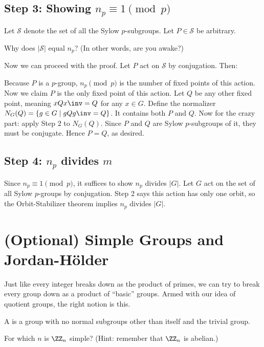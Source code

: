\subsection*{Step 3: Showing $n_p \equiv 1 \pmod p$}
Let $\mathcal S$ denote the set of all the Sylow $p$-subgroups.
Let $P \in \mathcal S$ be arbitrary.
\begin{ques}
	Why does $\left\lvert \mathcal S \right\rvert$ equal $n_p$?
	(In other words, are you awake?)
\end{ques}
Now we can proceed with the proof.
Let $P$ act on $\mathcal S$ by conjugation.
Then:
\begin{itemize}
	\ii Because $P$ is a $p$-group, $n_p \pmod p$ is the number of fixed points
	of this action.
	Now we claim $P$ is the only fixed point of this action.
	\ii Let $Q$ be any other fixed point, meaning $xQx\inv = Q$ for any $x \in G$.
	\ii Define the normalizer $N_G(Q) = \left\{ g \in G \mid gQg\inv = Q \right\}$.  It contains both $P$ and $Q$.
	\ii Now for the crazy part: apply Step 2 to $N_G(Q)$.
	Since $P$ and $Q$ are Sylow $p$-subgroups of it, they must be conjugate.
	\ii Hence $P=Q$, as desired.
\end{itemize}

\subsection*{Step 4: $n_p$ divides $m$}
Since $n_p \equiv 1 \pmod p$, it suffices to show $n_p$ divides $\left\lvert G \right\rvert$.
Let $G$ act on the set of all Sylow $p$-groups by conjugation.
Step 2 says this action has only one orbit, so the Orbit-Stabilizer theorem
implies $n_p$ divides $\left\lvert G \right\rvert$.


\section{(Optional) Simple Groups and Jordan-H\"older}
Just like every integer breaks down as the product of primes,
we can try to break every group down as a product of ``basic'' groups.
Armed with our idea of quotient groups, the right notion is this.

\begin{definition}
	A  is a group with no normal subgroups
	other than itself and the trivial group.
\end{definition}
\begin{ques}
	For which $n$ is $\Zc n$ simple? (Hint: remember that $\Zc n$ is abelian.)
\end{ques}

